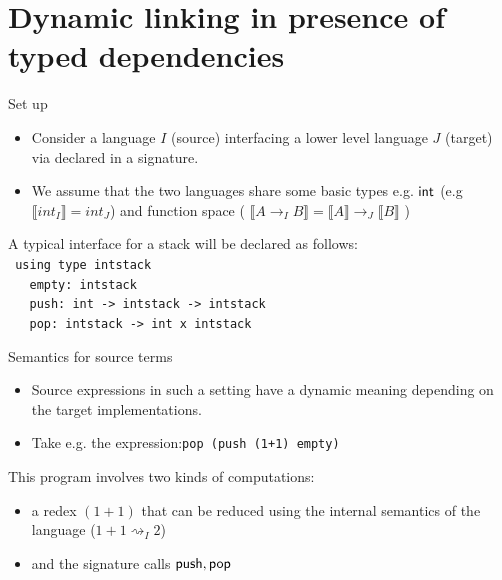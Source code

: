 \documentclass{beamer}
\begin{document}
 \section{Dynamic linking in presence of typed dependencies} 
  \begin{frame}{Set up}
   \begin{itemize}
    \item Consider a language $I$ (source) interfacing a lower level language $J$ (target) via declared in a signature.
    
    \item We assume that the two languages share some basic types e.g. ${\sf int}$ 
    (e.g $\llbracket int_I\rrbracket = int_J $) 
    and function space (
    $\llbracket A\rightarrow_I B\rrbracket =\llbracket A \rrbracket \rightarrow_J \llbracket B \rrbracket $
    )
   \end{itemize}
   A typical interface for a stack will be declared as follows:\\
   \texttt{
       using type intstack\\
      \ \ \    empty: intstack\\
      \ \ \    push: int -> intstack -> intstack\\
      \ \ \    pop: intstack -> int x intstack\\
   }
  \end{frame}
   \begin{frame}{Semantics for source terms}
   \begin{itemize}
    \item Source expressions in such a setting have a 
    dynamic meaning depending on the target implementations. 
    
    \item [] Take e.g. the expression:\texttt{pop (push (1+1) empty)}\\
   \end{itemize}
    This program involves two kinds of computations: 
    \begin{itemize}
      \item a redex $(1+1)$ that can be reduced using the internal semantics of the language ($1+1\rightsquigarrow_{I} 2$) 
      \item and the signature calls ${\sf push, pop}$ 
   \end{itemize}
  \end{frame}
\end{document}
